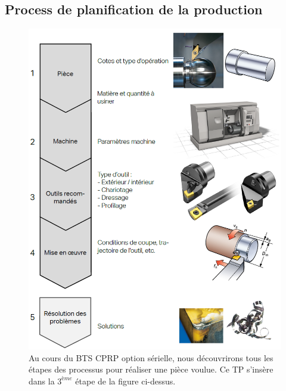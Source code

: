 \documentclass[12pt]{article}
\begin{document}
\subsection{Process de planification de la production}
\begin{figure}[h]
\centering
\includegraphics[width=0.75\linewidth]{Images/P1.png}
\caption{Au cours du BTS CPRP option sérielle, nous découvrirons tous les étapes des processus pour réaliser une pièce voulue. Ce TP s'insère dans la $3^{ème}$ étape de la figure ci-dessus.}
\label{P1}
\end{figure}


\newpage
\end{document}
